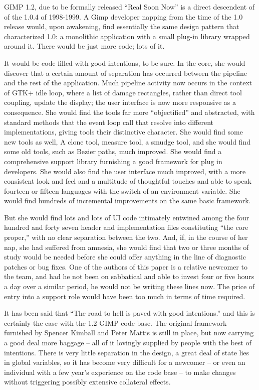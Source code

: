 
GIMP 1.2, due to be formally released ``Real Soon Now'' is a direct
descendent of of the 1.0.4 of 1998-1999. A Gimp developer napping from
the time of the 1.0 release would, upon awakening, find essentially
the same design pattern that characterized 1.0: a monolithic
application with a small plug-in library wrapped around it. There
would be just more code; lots of it.

It would be code filled with good intentions, to be sure. In the core,
she would discover that a certain amount of separation has occurred
between the pipeline and the rest of the application. Much pipeline
activity now occurs in the context of GTK+ idle loop, where a list of
damage rectangles, rather than direct tool coupling, update the
display; the user interface is now more responsive as a
consequence. She would find the tools far more ``objectified'' and
abstracted, with standard methods that the event loop call that
resolve into different implementations, giving tools their distinctive
character. She would find some new tools as well, A clone tool,
measure tool, a smudge tool, and she would find some old tools, such
as Bezier paths, much improved. She would find a comprehensive support
library furnishing a good framework for plug in developers. She would
also find the user interface much improved, with a more consistent
look and feel and a multitude of thoughtful touches and able to speak
fourteen or fifteen languages with the switch of an environment
variable. She would find hundreds of incremental improvements on the
same basic framework.

But she would find lots and lots of UI code intimately entwined among
the four hundred and forty seven header and implementation files
constituting ``the core proper,'' with no clear separation between the
two. And, if, in the course of her nap, she had suffered from amnesia,
she would find that two or three months of study would be needed
before she could offer anything in the line of diagnostic patches or
bug fixes. One of the authors of this paper is a relative newcomer to
the team, and had he not been on sabbatical and able to invest four or
five hours a day over a similar period, he would not be writing these
lines now. The price of entry into a support role would have been too
much in terms of time required.
 
It has been said that ``The road to hell is paved with good intentions.''
and this is certainly the case with the 1.2 GIMP code base. The original
framework furnished by Spencer Kimball and Peter Mattis is still in
place, but now carrying a good deal more baggage -- all of it lovingly
supplied by people with the best of intentions. There is very little 
separation in the design, a great deal of state lies in global variables,
so it has become very difficult for a newcomer -- or even an individual
with a few year's experience on the code base -- to make changes 
without triggering possibly extensive collateral effects.

